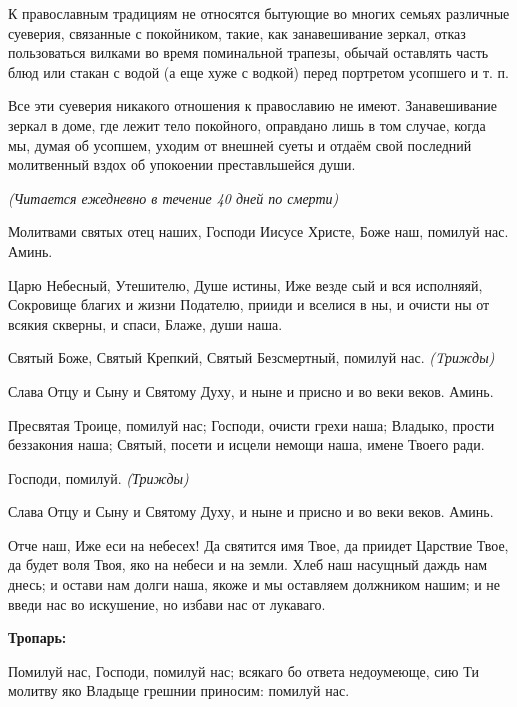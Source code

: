К православным традициям не относятся бытующие во многих семьях различные суеверия, связанные с покойником, такие, как занавешивание зеркал, отказ пользоваться вилками во время поминальной трапезы, обычай оставлять часть блюд или стакан с водой (а еще хуже с водкой) перед портретом усопшего и т. п. 

Все эти суеверия никакого отношения к православию не имеют. Занавешивание зеркал в доме, где лежит тело покойного, оправдано лишь в том случае, когда мы, думая об усопшем, уходим от внешней суеты и отдаём свой последний молитвенный вздох об упокоении преставльшейся души.\bfseries \itshape  

\normalfont{}\normalfont{} 


\mychapterending

 


\itshape (Читается ежедневно в течение 40 дней по смерти)\normalfont{}


   Молитвами святых отец наших, Господи Иисусе Христе, Боже наш,
помилуй нас. Аминь.


   Царю Небесный, Утешителю, Душе истины, Иже везде сый и вся
исполняяй, Сокровище благих и жизни Подателю, прииди и вселися в ны, и
очисти ны от всякия скверны, и спаси, Блаже, души наша.


   Святый Боже, Святый Крепкий, Святый Безсмертный, помилуй нас. \itshape 
(Tрижды)\normalfont{}


   Слава Отцу и Сыну и Святому Духу, и ныне и присно и во веки веков.
Аминь.


   Пресвятая Троице, помилуй нас; Господи, очисти грехи наша; Владыко,
прости беззакония наша; Святый, посети и исцели немощи наша, имене
Твоего ради.


   Господи, помилуй. \itshape  (Трижды)\normalfont{}


   Слава Отцу и Сыну и Святому Духу, и ныне и присно и во веки веков.
Аминь.


   Отче наш, Иже еси на небесех! Да святится имя Твое, да приидет
Царствие Твое, да будет воля Твоя, яко на небеси и на земли. Хлеб наш
насущный даждь нам днесь; и остави нам долги наша, якоже и мы оставляем
должником нашим; и не введи нас во искушение, но избави нас от
лукаваго.
   

 

\bfseries Тропарь:\normalfont{}

   Помилуй нас, Господи, помилуй нас; всякаго бо ответа недоумеюще, сию
Ти молитву яко Владыце грешнии приносим: помилуй нас.



